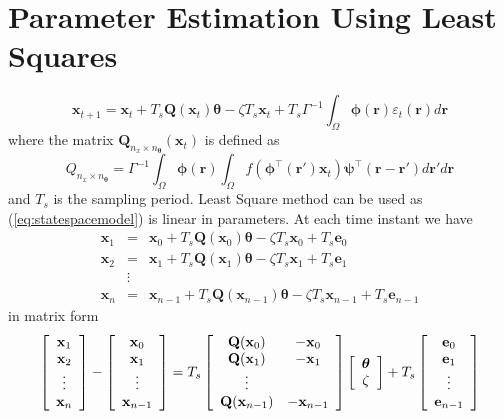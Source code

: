 \documentclass[12pt]{iopart}		%
\begin{document}
\section{Parameter Estimation Using Least Squares}\label{LeastSquaresAppendix}
\begin{equation}
 \mathbf x_{t+1}=\mathbf{x}_{t}+T_s \mathbf{Q}(\mathbf{x}_t)\boldsymbol{\theta}-\zeta T_s\mathbf{x}_t+T_s\Gamma^{-1}\int_\Omega\boldsymbol{\phi}(\mathbf r)\varepsilon_t(\mathbf r)d\mathbf r
\label{eq:statespacemodel}
\end{equation}
where the matrix $\mathbf Q_{n_x \times n_{\boldsymbol{\theta}}}(\mathbf x_t)$ is defined as
\begin{equation}
 Q_{n_x \times n_{\boldsymbol{\theta}}}=\Gamma^{-1}\int_\Omega\boldsymbol{\phi}(\mathbf r)\int_\Omega f(\boldsymbol{\phi}^\top(\mathbf r')\mathbf x_t)\mathbf{\psi}^\top(\mathbf r-\mathbf r')d\mathbf r'd\mathbf r
\end{equation}
and $T_s$ is the sampling period. Least Square method can be used as (\ref{eq:statespacemodel}) is linear in parameters. At each time instant we have
\begin{eqnarray}
 \mathbf x_{1}&=&\mathbf x_{0}+T_s \mathbf Q(\mathbf x_0) \boldsymbol{\theta}-\zeta T_s\mathbf x_0+T_s\mathbf e_0 \nonumber \\
 \mathbf x_{2}&=&\mathbf x_{1}+T_s \mathbf Q(\mathbf x_1) \boldsymbol{\theta}-\zeta T_s\mathbf x_1+T_s\mathbf e_1\nonumber\\
&\vdots& \nonumber\\
 \mathbf x_{n}&=&\mathbf x_{n-1}+T_s \mathbf Q(\mathbf x_{n-1}) \boldsymbol{\theta}-\zeta T_s\mathbf x_{n-1}+T_s\mathbf e_{n-1}
\end{eqnarray}
in matrix form
\begin{equation}
 \left[\begin{array}{{cccc}} \mathbf x_{1}\\\mathbf x_{2}\\\vdots\\\mathbf x_{n}\end{array}\right]
	-\left[\begin{array}{cccc} \mathbf x_{0}\\\mathbf x_{1}\\\vdots\\\mathbf x_{n-1}\end{array}\right]
	=T_s\left[\begin{array}{cc}\mathbf Q(\mathbf x_0)&-\mathbf x_{0}\\\mathbf Q(\mathbf x_1)&-\mathbf x_{1}\\\vdots\\ \mathbf Q(\mathbf x_{n-1})&-\mathbf x_{n-1}\end{array}\right]
	\left[\begin{array}{cc} \boldsymbol{\theta} \\ \zeta\end{array}\right]+T_s
		\left[\begin{array}{cccc}\mathbf e_0\\\mathbf e_1\\\vdots\\\mathbf e_{n-1}\end{array}\right]
\end{equation}
\end{document}
